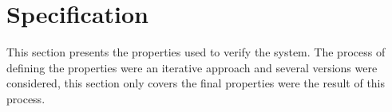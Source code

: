 




\newpage
\section{Specification}

This section presents the properties used to verify the system. The process of defining the properties were an iterative approach and several versions were considered, this section only covers the final properties were the result of this process. 

